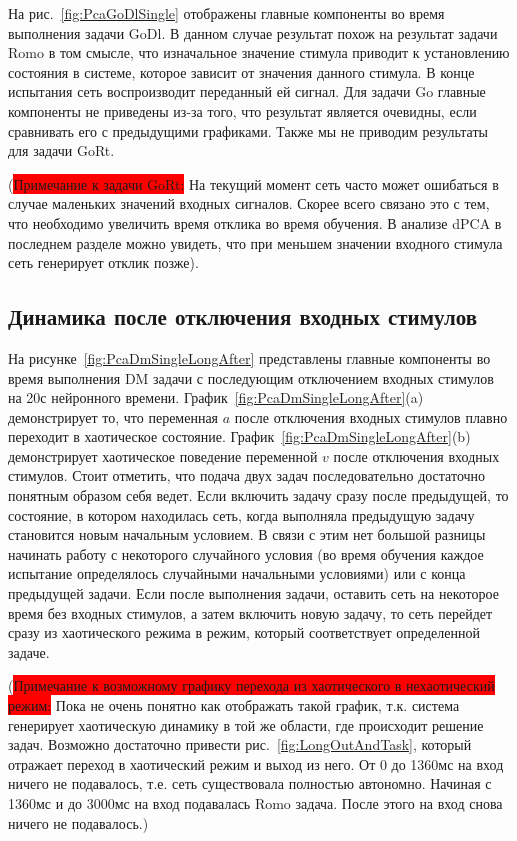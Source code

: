 \documentclass{article}
\begin{document}
На рис.~\ref{fig:PcaGoDlSingle} отображены главные компоненты во время выполнения задачи GoDl. В данном случае результат похож на результат задачи Romo в том смысле, что изначальное значение стимула приводит к установлению состояния в системе, которое зависит от значения данного стимула. В конце испытания сеть воспроизводит переданный ей сигнал. Для задачи Go главные компоненты не приведены из-за того, что результат является очевидны, если сравнивать его с предыдущими графиками. Также мы не приводим результаты для задачи GoRt.

(\colorbox{red}{Примечание к задачи GoRt:} На текущий момент сеть часто может ошибаться в случае маленьких значений входных сигналов. Скорее всего связано это с тем, что необходимо увеличить время отклика во время обучения. В анализе dPCA в последнем разделе можно увидеть, что при меньшем значении входного стимула сеть генерирует отклик позже).

\subsection{Динамика после отключения входных стимулов}
На рисунке~\ref{fig:PcaDmSingleLongAfter} представлены главные компоненты во время выполнения DM задачи с последующим отключением входных стимулов на 20с нейронного времени. График~\ref{fig:PcaDmSingleLongAfter}(a) демонстрирует то, что переменная $a$ после отключения входных стимулов плавно переходит в хаотическое состояние. График~\ref{fig:PcaDmSingleLongAfter}(b) демонстрирует хаотическое поведение переменной $v$ после отключения входных стимулов. Стоит отметить, что подача двух задач последовательно достаточно понятным образом себя ведет. Если включить задачу сразу после предыдущей, то состояние, в котором находилась сеть, когда выполняла предыдущую задачу становится новым начальным условием. В связи с этим нет большой разницы начинать работу с некоторого случайного условия (во время обучения каждое испытание определялось случайными начальными условиями) или с конца предыдущей задачи. Если после выполнения задачи, оставить сеть на некоторое время без входных стимулов, а затем включить новую задачу, то сеть перейдет сразу из хаотического режима в режим, который соответствует определенной задаче.


(\colorbox{red}{Примечание к возможному графику перехода из хаотического в нехаотический режим:} Пока не очень понятно как отображать такой график, т.к. система генерирует хаотическую динамику в той же области, где происходит решение задач. Возможно достаточно привести рис.~\ref{fig:LongOutAndTask}, который отражает переход в хаотический режим и выход из него. От 0 до 1360мс на вход ничего не подавалось, т.е. сеть существовала полностью автономно. Начиная с 1360мс и до 3000мс на вход подавалась Romo задача. После этого на вход снова ничего не подавалось.)
\end{document}
